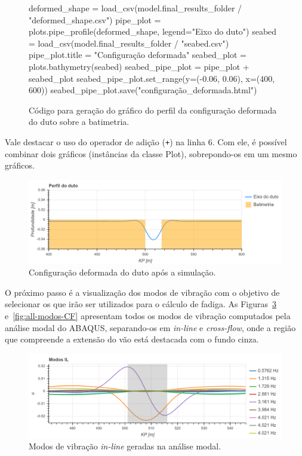 \begin{figure}[!ht] %
\caption{Código para geração do gráfico do perfil da configuração deformada do duto sobre a batimetria.}\label{code:deformada}
\begin{pythoncode}
deformed_shape = load_csv(model.final_results_folder / "deformed_shape.csv")
pipe_plot = plots.pipe_profile(deformed_shape, legend="Eixo do duto")
seabed = load_csv(model.final_results_folder / "seabed.csv")
pipe_plot.title = "Configuração deformada"
seabed_plot = plots.bathymetry(seabed)
seabed_pipe_plot = pipe_plot + seabed_plot
seabed_pipe_plot.set_range(y=(-0.06, 0.06), x=(400, 600))
seabed_pipe_plot.save("configuração_deformada.html")
\end{pythoncode}
\end{figure}

Vale destacar o uso do operador de adição (\texttt{+}) na linha 6. Com ele, é possível combinar dois gráficos (instâncias da classe Plot), sobrepondo-os em um mesmo gráficos.

\begin{figure}[!ht]
	\centering
	\caption{Configuração deformada do duto após a simulação.}\label{fig:ex-config-deformada}
	\includegraphics[width=\textwidth]{imagens/exemplo/deformada}
\end{figure}

O próximo passo é a visualização dos modos de vibração com o objetivo de selecionar os que irão ser utilizados para o cálculo de fadiga. As Figuras~\ref{fig:all-modos-IL} e~\ref{fig:all-modos-CF} apresentam todos os modos de vibração computados pela análise modal do ABAQUS, separando-os em \textit{in-line} e \textit{cross-flow}, onde a região que compreende a extensão do vão está destacada com o fundo cinza.

\begin{figure}[H]
	\centering
	\caption{Modos de vibração \textit{in-line} geradas na análise modal.}\label{fig:all-modos-IL}
	\includegraphics[width=\textwidth]{imagens/exemplo/all_modos_IL}
\end{figure}

